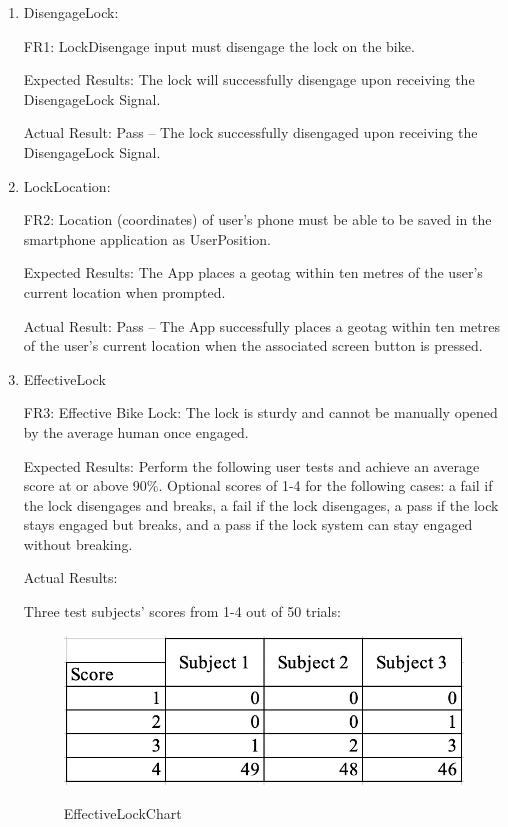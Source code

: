 \documentclass[12pt, titlepage]{article}
\begin{document}
\begin{enumerate}

\item{DisengageLock: 

FR1: LockDisengage input must disengage the lock on the bike. } 

Expected Results: The lock will successfully disengage upon receiving the DisengageLock Signal. 

Actual Result: Pass -- The lock successfully disengaged upon receiving the DisengageLock Signal. 
 
\item{LockLocation: 

FR2: Location (coordinates) of user’s phone must be able to be saved in the smartphone application as UserPosition. } 

Expected Results: The App places a geotag within ten metres of the user's current location when prompted.

Actual Result: Pass -- The App successfully places a geotag within ten metres of the user's current location when the associated screen button is pressed. 

\item{EffectiveLock

FR3: Effective Bike Lock: The lock is sturdy and cannot be manually opened by the average human once engaged. }

Expected Results: Perform the following user tests and achieve an average score at or above 90\%. Optional scores of 1-4 for the following cases: a fail if the lock disengages and breaks, a fail if the lock disengages, a pass if the lock stays engaged but breaks, and a pass if the lock system can stay engaged without breaking. 

Actual Results:

Three test subjects’ scores from 1-4 out of 50 trials: 
 \begin{figure}[h!]
 \begin{center}
 {
 \includegraphics[width=0.8\linewidth]{EffectiveLockChart}
 }
 \caption{\label{EffectiveLockChart} EffectiveLockChart}
 \end{center}
 \end{figure}


\end{enumerate}
\end{document}
